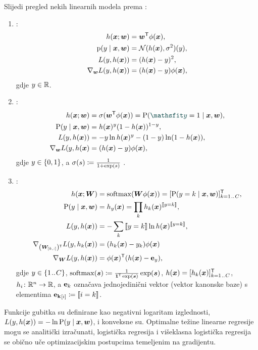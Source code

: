\documentclass[utf8, diplomski, lmodern]{fer}
\begin{document}
Slijedi pregled nekih linearnih modela prema \citet{Snajder:2017:SULR2}:
\begin{enumerate}[topsep=0pt,itemsep=0pt,partopsep=0pt]
\item {}:
\begin{align*}
h(\vec x;\vec w) &= \vec w^\tp\phi(\vec x), \\
\p(y\mid\vec x,\vec w) &= \mathcal{N}(h(\vec x),\sigma^2)(y), \\
L(y, h(\vec x)) &= \del{h(\vec x)-y}^2, \\
\nabla_{\vec w}L(y, h(\vec x)) &= \del{h(\vec x)-y}\phi(\vec x),
\end{align*}
gdje $y\in\mathbb{R}$.
\item {}:
\begin{align*}
h(\vec x;\vec w) &= \sigma(\vec w^\tp\phi(\vec x)) = \P(\rvar y=1\mid\vec x,\vec w), \\
\P(y\mid\vec x,\vec w) &= h(\vec x)^y(1-h(\vec x))^{1-y}, \\
L(y, h(\vec x)) &= -y\ln h(\vec x)^y-(1-y)\ln(1-h(\vec x)), \\
\nabla_{\vec w}L(y, h(\vec x) &= \del{h(\vec x)-y}\phi(\vec x),
\end{align*}
gdje $y\in\cbr{0,1}$, a $\sigma(s)\coloneqq\frac{1}{1+\exp\del{s}}$ .
\item {}:
\begin{align*}
h(\vec x;\vec W) &= \softmax(\vec W\phi(\vec x)) = \sbr{\P(y=k\mid\vec x,\vec w)}_{k=1\bidot C}^\tp, \\
\P(y\mid\vec x,\vec w) &= h_y(\vec x) = \prod_k h_k(\vec x)^\enbbracket{y=k}, \\
L(y, h(\vec x)) &= -\sum_k \enbbracket{y=k}\ln h(\vec x)^\enbbracket{y=k}, \\
\nabla_{\del{\vec W_\ind{k,:}}^\tp}L(y, h_k(\vec x)) &= \del{h_k(\vec x)-y_k}\phi(\vec x) \\
\nabla_{\vec W}L(y, h(\vec x)) &= \phi(\vec x)^\tp \del{h(\vec x)-\cvec e_y} \text{,}
\end{align*}
gdje $y\in\cbr{1\bidot C}$, $\softmax(\vec s)\coloneqq\frac{1}{\cvec 1^\tp\exp(\vec s)}\exp(\vec s)$, $h(\vec x)=\sbr{h_k(\vec x)}_{k=1\bidot C}^\tp$, $h_i \colon \mathbb{R}^n \to \mathbb{R}$, a $\mathbf{e}_k$ označava jednojedinični vektor (vektor kanonske baze) s elementima $\cvec {e_k}_\ind{i}\coloneqq\enbbracket{i=k}$.
\end{enumerate}
Funkcije gubitka su definirane kao negativni logaritam izglednosti, $L(y, h(\vec x))=-\ln\P(y\mid\vec x,\vec w)$, i konveksne su. Optimalne težine linearne regresije mogu se analitički izračunati, logistička regresija i višeklasna logistička regresija se obično uče optimizacijskim postupcima temeljenim na gradijentu.
\end{document}
